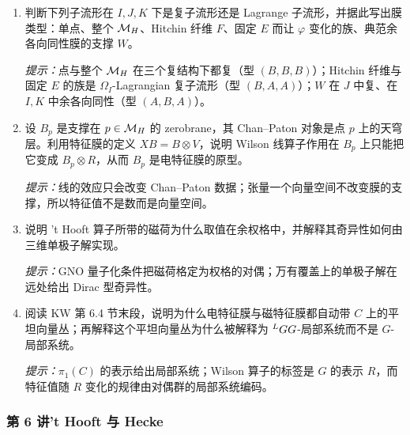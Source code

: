 \begin{enumerate}[label=\arabic*.,start=17,leftmargin=2.4em,itemsep=6pt]
\item 判断下列子流形在 $I,J,K$ 下是复子流形还是 Lagrange 子流形，并据此写出膜类型：单点、整个 $\mathcal{M}_{H}$、Hitchin 纤维 $F$、固定 $E$ 而让 $\varphi$ 变化的族、典范余各向同性膜的支撑 $W$。
\par\smallskip\noindent\emph{提示：}点与整个 $\mathcal{M}_{H}$ 在三个复结构下都复（型 $(B,B,B)$）；Hitchin 纤维与固定 $E$ 的族是 $\Omega_I$-Lagrangian 复子流形（型 $(B,A,A)$）；$W$ 在 $J$ 中复、在 $I,K$ 中余各向同性（型 $(A,B,A)$）。

\item 设 $B_p$ 是支撑在 $p\in\mathcal{M}_{H}$ 的 zerobrane，其 Chan--Paton 对象是点 $p$ 上的天穹层。利用特征膜的定义 $XB=B\otimes V$，说明 Wilson 线算子作用在 $B_p$ 上只能把它变成 $B_p\otimes R$，从而 $B_p$ 是电特征膜的原型。
\par\smallskip\noindent\emph{提示：}线的效应只会改变 Chan--Paton 数据；张量一个向量空间不改变膜的支撑，所以特征值不是数而是向量空间。

\item 说明 't Hooft 算子所带的磁荷为什么取值在余权格中，并解释其奇异性如何由三维单极子解实现。
\par\smallskip\noindent\emph{提示：}GNO 量子化条件把磁荷格定为权格的对偶；万有覆盖上的单极子解在远处给出 Dirac 型奇异性。

\item 阅读 KW 第 6.4 节末段，说明为什么电特征膜与磁特征膜都自动带 $C$ 上的平坦向量丛；再解释这个平坦向量丛为什么被解释为 ${}^{L}G G$-局部系统而不是 $G$-局部系统。
\par\smallskip\noindent\emph{提示：}$\pi_1(C)$ 的表示给出局部系统；Wilson 算子的标签是 $G$ 的表示 $R$，而特征值随 $R$ 变化的规律由对偶群的局部系统编码。
\end{enumerate}

\subsubsection*{第 6 讲\quad 't Hooft 与 Hecke}


